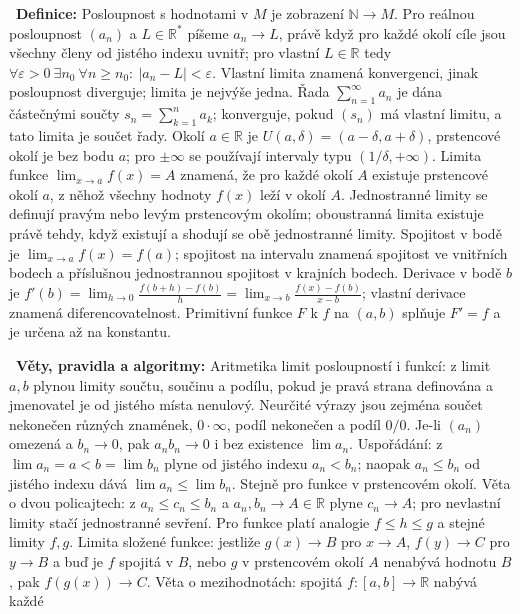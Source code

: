 \begin{odpoved}
\setlength{\parskip}{2pt}
\noindent{}\ \textbf{Definice:} Posloupnost s hodnotami v $M$ je zobrazení
$\mathbb N\to M$. Pro reálnou posloupnost $(a_n)$ a $L\in\mathbb R^*$ píšeme
$a_n\to L$, právě když pro každé okolí cíle jsou všechny členy od jistého indexu uvnitř;
pro vlastní $L\in\mathbb R$ tedy
$\forall\varepsilon>0\ \exists n_0\ \forall n\ge n_0:\ |a_n-L|<\varepsilon$.
Vlastní limita znamená konvergenci, jinak posloupnost diverguje; limita je nejvýše jedna.
Řada $\sum_{n=1}^{\infty}a_n$ je dána částečnými součty $s_n=\sum_{k=1}^n a_k$;
konverguje, pokud $(s_n)$ má vlastní limitu, a tato limita je součet řady. Okolí
$a\in\mathbb R$ je $U(a,\delta)=(a-\delta,a+\delta)$, prstencové okolí je bez bodu
$a$; pro $\pm\infty$ se používají intervaly typu $(1/\delta,+\infty)$. Limita funkce
$\lim_{x\to a}f(x)=A$ znamená, že pro každé okolí $A$ existuje prstencové okolí $a$,
z něhož všechny hodnoty $f(x)$ leží v okolí $A$. Jednostranné limity se definují
pravým nebo levým prstencovým okolím; oboustranná limita existuje právě tehdy, když
existují a shodují se obě jednostranné limity. Spojitost v bodě je
$\lim_{x\to a}f(x)=f(a)$; spojitost na intervalu znamená spojitost ve vnitřních bodech
a příslušnou jednostrannou spojitost v krajních bodech. Derivace v bodě $b$ je
$f'(b)=\lim_{h\to0}\frac{f(b+h)-f(b)}h=\lim_{x\to b}\frac{f(x)-f(b)}{x-b}$;
vlastní derivace znamená diferencovatelnost. Primitivní funkce $F$ k $f$ na $(a,b)$
splňuje $F'=f$ a je určena až na konstantu.\par
\noindent{}\ \textbf{Věty, pravidla a algoritmy:} Aritmetika limit posloupností i funkcí:
z limit $a,b$ plynou limity součtu, součinu a podílu, pokud je pravá strana definována
a jmenovatel je od jistého místa nenulový. Neurčité výrazy jsou zejména součet nekonečen
různých znamének, $0\cdot\infty$, podíl nekonečen a podíl $0/0$.
Je-li $(a_n)$ omezená a $b_n\to0$, pak $a_nb_n\to0$ i bez existence $\lim a_n$.
Uspořádání: z $\lim a_n=a< b=\lim b_n$ plyne od jistého indexu $a_n<b_n$; naopak
$a_n\le b_n$ od jistého indexu dává $\lim a_n\le\lim b_n$. Stejně pro funkce v
prstencovém okolí. Věta o dvou policajtech: z $a_n\le c_n\le b_n$ a
$a_n,b_n\to A\in\mathbb R$ plyne $c_n\to A$; pro nevlastní limity stačí jednostranné
sevření. Pro funkce platí analogie $f\le h\le g$ a stejné limity $f,g$. Limita složené
funkce: jestliže $g(x)\to B$ pro $x\to A$, $f(y)\to C$ pro $y\to B$ a buď je $f$
spojitá v $B$, nebo $g$ v prstencovém okolí $A$ nenabývá hodnotu $B$, pak
$f(g(x))\to C$. Věta o mezihodnotách: spojitá $f:[a,b]\to\mathbb R$ nabývá každé

\end{odpoved}
